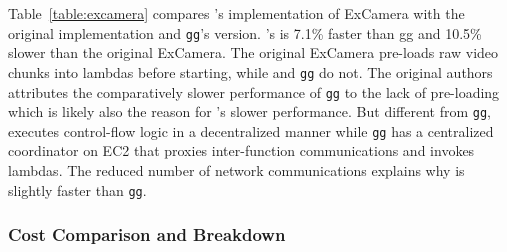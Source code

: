 
Table~\ref{table:excamera} compares \name{}'s implementation of ExCamera with
the original implementation and \texttt{gg}'s version. \name{}'s is 7.1\%
faster than gg and 10.5\% slower than the original ExCamera. The original
ExCamera pre-loads raw video chunks into lambdas before starting, while
\name{} and \texttt{gg} do not. The original authors attributes the
comparatively slower performance of \texttt{gg} to the lack of pre-loading
which is likely also the reason for \name{}'s slower performance. But
different from \texttt{gg}, \name{} executes control-flow logic in a
decentralized manner while \texttt{gg} has a centralized coordinator on EC2
that proxies inter-function communications and invokes lambdas. The reduced
number of network communications  explains why \name{} is slightly
faster than \texttt{gg}.


\subsubsection{Cost Comparison and Breakdown}

